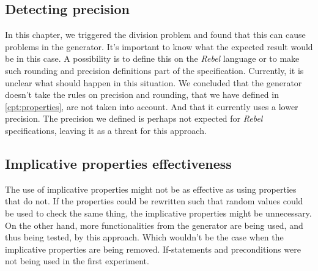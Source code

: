 \subsection*{Detecting precision}
In this chapter, we triggered the division problem and found that this can
cause problems in the generator. It's important to know what the expected result
would be in this case. A possibility is to define this on the \textit{Rebel}
language or to make such rounding and precision definitions part of the
specification. Currently, it is unclear what should happen in this situation. We
concluded that the generator doesn't take the rules on precision and rounding,
that we have defined in \autoref{cpt:properties}, are not taken into account.
And that it currently uses a lower precision. The precision we defined is
perhaps not expected for \textit{Rebel} specifications, leaving it as a threat
for this approach.

\subsection*{Implicative properties effectiveness}
The use of implicative properties might not be as effective as using properties
that do not. If the properties could be rewritten such that random values could
be used to check the same thing, the implicative properties might be
unnecessary. On the other hand, more functionalities from the generator are
being used, and thus being tested, by this approach. Which wouldn't be the case
when the implicative properties are being removed. If-statements and
preconditions were not being used in the first experiment.

